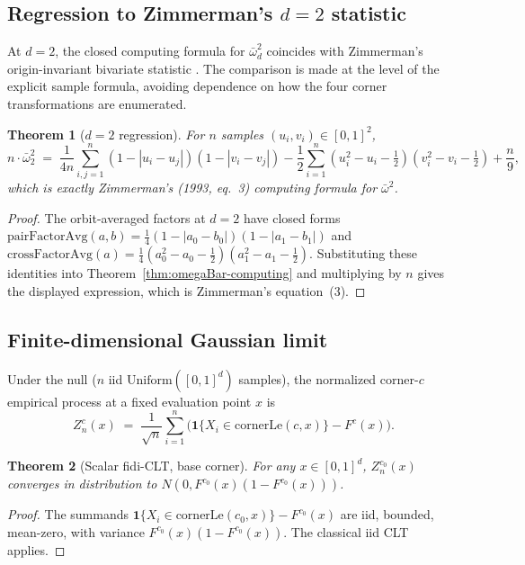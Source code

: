 \documentclass[pdflatex]{sn-jnl}
\theoremstyle{thmstyleone}
\newtheorem{theorem}{Theorem}[section]
\theoremstyle{thmstyletwo}
\theoremstyle{thmstylethree}
\begin{document}
\subsection{Regression to Zimmerman's \texorpdfstring{$d=2$}{d=2} statistic}\label{sec:d2-regression}

At $d=2$, the closed computing formula for $\bar\omega^2_d$ coincides with Zimmerman's origin-invariant bivariate statistic \cite{Zimmerman1993}. The comparison is made at the level of the explicit sample formula, avoiding dependence on how the four corner transformations are enumerated.

\begin{theorem}[$d=2$ regression]\label{thm:d2-regression}
For $n$ samples $(u_i,v_i)\in[0,1]^2$,
\[
  n\cdot\bar\omega^2_2 \;=\; \frac{1}{4n}\sum_{i,j=1}^n(1-|u_i-u_j|)(1-|v_i-v_j|) - \frac{1}{2}\sum_{i=1}^n(u_i^2-u_i-\tfrac{1}{2})(v_i^2-v_i-\tfrac{1}{2}) + \frac{n}{9},
\]
which is exactly Zimmerman's (1993, eq.~3) computing formula for $\bar\omega^2$.
\end{theorem}

\begin{proof}
The orbit-averaged factors at $d=2$ have closed forms $\mathrm{pairFactorAvg}(a,b) = \frac{1}{4}(1-|a_0-b_0|)(1-|a_1-b_1|)$ and $\mathrm{crossFactorAvg}(a) = \frac{1}{4}(a_0^2-a_0-\frac{1}{2})(a_1^2-a_1-\frac{1}{2})$. Substituting these identities into Theorem~\ref{thm:omegaBar-computing} and multiplying by $n$ gives the displayed expression, which is Zimmerman's equation~(3).
\end{proof}

\subsection{Finite-dimensional Gaussian limit}\label{sec:fidi-clt}

Under the null ($n$ iid $\mathrm{Uniform}([0,1]^d)$ samples), the normalized corner-$c$ empirical process at a fixed evaluation point $x$ is
\[
  Z_n^c(x) \;=\; \frac{1}{\sqrt{n}}\sum_{i=1}^n\bigl(\mathbf{1}\{X_i\in\mathrm{cornerLe}(c,x)\} - F^c(x)\bigr).
\]

\begin{theorem}[Scalar fidi-CLT, base corner]\label{thm:scalar-clt}
For any $x\in[0,1]^d$, $Z_n^{c_0}(x)$ converges in distribution to $N(0, F^{c_0}(x)(1-F^{c_0}(x)))$.
\end{theorem}

\begin{proof}
The summands $\mathbf{1}\{X_i\in\mathrm{cornerLe}(c_0,x)\} - F^{c_0}(x)$ are iid, bounded, mean-zero, with variance $F^{c_0}(x)(1-F^{c_0}(x))$. The classical iid CLT applies.
\end{proof}
\end{document}
